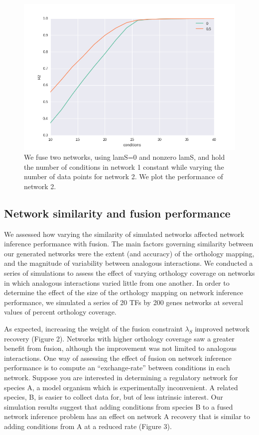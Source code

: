 \documentclass[11pt]{article}
\begin{document}
\begin{figure}
\begin{center}
  \includegraphics[scale=0.45]{increase_data2.png}
  \caption{\label{fig:figure1} We fuse two networks, using lamS=0 and nonzero lamS, and hold the number of conditions in network 1 constant while varying the number of data points for network 2. We plot the performance of network 2.}
  \end{center}
\end{figure}

\subsection{Network similarity and fusion performance}
We assessed how varying the similarity of simulated networks affected network inference performance with fusion. The main factors governing similarity between our generated networks were the extent (and accuracy) of the orthology mapping, and the magnitude of variability between analogous interactions. We conducted a series of simulations to assess the effect of varying orthology coverage on networks in which analogous interactions varied little from one another. In order to determine the effect of the size of the orthology mapping on network inference performance, we simulated a series of 20 TFs by 200 genes networks at several values of percent orthology coverage. 

As expected, increasing the weight of the fusion constraint $\lambda_S$ improved network recovery (Figure 2). Networks with higher orthology coverage saw a greater benefit from fusion, although the improvement was not limited to analogous interactions. One way of assessing the effect of fusion on network inference performance is to compute an ``exchange-rate'' between conditions in each network. Suppose you are interested in determining a regulatory network for species A, a model organism which is experimentally inconvenient. A related species, B, is easier to collect data for, but of less intrinsic interest. Our simulation results suggest that adding conditions from species B to a fused network inference problem has an effect on network A recovery that is similar to adding conditions from A at a reduced rate (Figure 3). 
\end{document}
